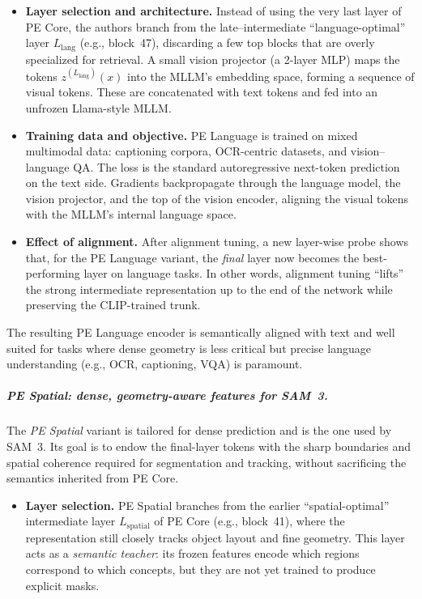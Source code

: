 \begin{enrichment}
\begin{enrichment}
		\begin{itemize}
			\item \textbf{Layer selection and architecture.}
			Instead of using the very last layer of PE Core, the authors branch from the late–intermediate “language-optimal” layer \(L_{\text{lang}}\) (e.g., block~47), discarding a few top blocks that are overly specialized for retrieval. A small vision projector (a 2-layer MLP) maps the tokens \(z^{(L_{\text{lang}})}(x)\) into the MLLM’s embedding space, forming a sequence of visual tokens. These are concatenated with text tokens and fed into an unfrozen Llama-style MLLM.
			\item \textbf{Training data and objective.}
			PE Language is trained on mixed multimodal data: captioning corpora, OCR-centric datasets, and vision–language QA. The loss is the standard autoregressive next-token prediction on the text side. Gradients backpropagate through the language model, the vision projector, and the top of the vision encoder, aligning the visual tokens with the MLLM’s internal language space.
			
			\newpage
			
			\item \textbf{Effect of alignment.}
			After alignment tuning, a new layer-wise probe shows that, for the PE Language variant, the \emph{final} layer now becomes the best-performing layer on language tasks. In other words, alignment tuning “lifts” the strong intermediate representation up to the end of the network while preserving the CLIP-trained trunk.
		\end{itemize}
		
		The resulting PE Language encoder is semantically aligned with text and well suited for tasks where dense geometry is less critical but precise language understanding (e.g., OCR, captioning, VQA) is paramount.
		
		\subparagraph*{PE Spatial: dense, geometry-aware features for SAM~3.}
		
		The \emph{PE Spatial} variant is tailored for dense prediction and is the one used by SAM~3. Its goal is to endow the final-layer tokens with the sharp boundaries and spatial coherence required for segmentation and tracking, without sacrificing the semantics inherited from PE Core.
		
		\begin{itemize}
			\item \textbf{Layer selection.}
			PE Spatial branches from the earlier “spatial-optimal” intermediate layer \(L_{\text{spatial}}\) of PE Core (e.g., block~41), where the representation still closely tracks object layout and fine geometry. This layer acts as a \emph{semantic teacher}: its frozen features encode which regions correspond to which concepts, but they are not yet trained to produce explicit masks.
			

\end{itemize}
\end{enrichment}
\end{enrichment}
